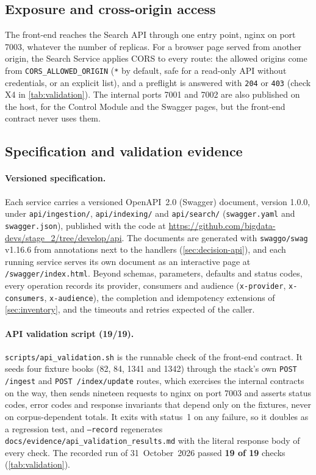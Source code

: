 \documentclass[10pt,a4paper]{article}
\newcommand{\code}[1]{\texttt{#1}}
\newcommand{\route}[1]{\texttt{#1}}
\newcommand{\repourl}{https://github.com/bigdata-devs/stage_2}
\begin{document}
\subsection{Exposure and cross-origin access}
\label{sec:cors}

The front-end reaches the Search API through one entry point, nginx on port
7003, whatever the number of replicas. For a browser page served from another
origin, the Search Service applies CORS to every route: the allowed origins
come from \code{CORS\_ALLOWED\_ORIGIN} (\code{*} by default, safe for a
read-only API without credentials, or an explicit list), and a preflight is
answered with \code{204} or \code{403} (check X4 in \cref{tab:validation}).
The internal ports 7001 and 7002 are also published on the host, for the
Control Module and the Swagger pages, but the front-end contract never uses
them.

\subsection{Specification and validation evidence}
\label{sec:validation}

\paragraph{Versioned specification.}
Each service carries a versioned OpenAPI~2.0 (Swagger) document, version
1.0.0, under \code{api/ingestion/}, \code{api/indexing/} and \code{api/search/}
(\code{swagger.yaml} and \code{swagger.json}), published with the code at
\url{\repourl/tree/develop/api}. The documents are generated with
\code{swaggo/swag} v1.16.6 from annotations next to the handlers
(\cref{sec:decision-api}), and each running service serves its own document as
an interactive page at \route{/swagger/index.html}. Beyond schemas,
parameters, defaults and status codes, every operation records its provider,
consumers and audience (\code{x-provider}, \code{x-consumers},
\code{x-audience}), the completion and idempotency extensions of
\cref{sec:inventory}, and the timeouts and retries expected of the caller.

\paragraph{API validation script (19/19).}
\code{scripts/api\_validation.sh} is the runnable check of the front-end
contract. It seeds four fixture books (82, 84, 1341 and 1342) through the
stack's own \route{POST /ingest} and \route{POST /index/update} routes, which
exercises the internal contracts on the way, then sends nineteen requests to
nginx on port 7003 and asserts status codes, error codes and response
invariants that depend only on the fixtures, never on corpus-dependent totals.
It exits with status~1 on any failure, so it doubles as a regression test, and
\code{--record} regenerates
\code{docs/evidence/\allowbreak api\_validation\_results.md} with the literal
response body of every check. The recorded run of 31~October~2026 passed
\textbf{19 of 19} checks (\cref{tab:validation}).
\end{document}
